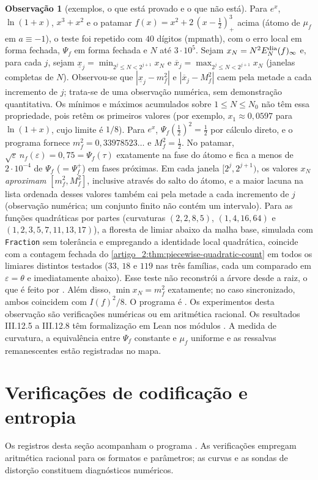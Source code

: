 \documentclass[12pt,a4paper]{article}
\theoremstyle{preciso}
\theoremstyle{definition}
\theoremstyle{preciso}
\theoremstyle{preciso}
\theoremstyle{preciso}
\theoremstyle{preciso}
\theoremstyle{definition}
\theoremstyle{preciso}
\theoremstyle{definition}
\newtheorem{remark}[teorema]{Observação}
\theoremstyle{preciso}
\theoremstyle{preciso}
\theoremstyle{definition}
\begin{document}
\begin{remark}[exemplos, o que está provado e o que não está]
Para $e^x$, $\ln(1+x)$, $x^3+x^2$ e o patamar $f(x)=x^2+2\,(x-\tfrac12)_+^3$
acima (átomo de $\mu_f$ em $a\equiv-1$), o teste foi repetido com $40$ dígitos
(mpmath), com o erro local em forma fechada, $\Psi_f$ em forma fechada e
$N$ até $3\cdot10^5$. Sejam $x_N=N^2E_N^{\rm dia}(f)_\infty$ e, para cada $j$, sejam
$\underline x_j=\min_{2^j\le N<2^{j+1}}x_N$ e $\overline x_j=\max_{2^j\le N<2^{j+1}}x_N$
(janelas completas de $N$). Observou-se que $|\underline x_j-m_f^2|$ e $|\overline x_j-M_f^2|$
caem pela metade a cada incremento de $j$; trata-se de uma observação numérica, sem
demonstração quantitativa. Os mínimos e máximos acumulados sobre $1\le N\le N_0$
não têm essa propriedade, pois retêm os primeiros valores (por exemplo,
$x_1\approx0{,}0597$ para $\ln(1+x)$, cujo limite é $1/8$). Para $e^x$, $\Psi_f(\tfrac12)^2=\tfrac12$ por
cálculo direto, e o programa fornece $m_f^2=0{,}33978523\ldots$ e $M_f^2=\tfrac12$.
No patamar, $\sqrt\varepsilon\,n_f(\varepsilon)=0{,}75=\Psi_f(\tau)$ exatamente na
fase do átomo e fica a menos de $2\cdot10^{-4}$ de $\Psi_f$ ($=\Psi_f^+$) em fases próximas.
Em cada janela $[2^j,2^{j+1})$, os valores $x_N$ \emph{aproximam}
$[m_f^2,M_f^2]$, inclusive através do salto do átomo, e a maior lacuna na lista
ordenada desses valores também cai pela metade a cada incremento de $j$
(observação numérica; um conjunto finito não contém um intervalo).
Para as funções quadráticas por partes (curvaturas
$(2,2,8,5)$, $(1,4,16,64)$ e $(1,2,3,5,7,11,13,17)$), a floresta de limiar
abaixo da malha base, simulada com \texttt{Fraction} sem tolerância e empregando a
identidade local quadrática, coincide com a contagem fechada do
\cref{artigo_2:thm:piecewise-quadratic-count} em todos os limiares distintos
testados ($33$, $18$ e $119$ nas três famílias, cada um comparado em $\varepsilon=\theta$
e imediatamente abaixo). Esse teste não reconstrói a árvore desde a raiz, o que
é feito por . Além disso,
$\min x_N=m_f^2$ exatamente; no caso sincronizado, ambos coincidem com
$I(f)^2/8$. O programa é . Os experimentos desta observação são verificações numéricas ou em aritmética racional. Os resultados III.12.5 a III.12.8 têm formalização em Lean nos módulos . A medida de curvatura, a equivalência entre $\Psi_f$ constante e $\mu_f$ uniforme e as ressalvas remanescentes estão registradas no mapa.
\end{remark}

\section{Verificações de codificação e entropia}
\label{artigo_2:sec:coding-validation}
Os registros desta seção acompanham o programa . As verificações empregam aritmética racional para os formatos e parâmetros; as curvas e as sondas de distorção constituem diagnósticos numéricos.
\end{document}
